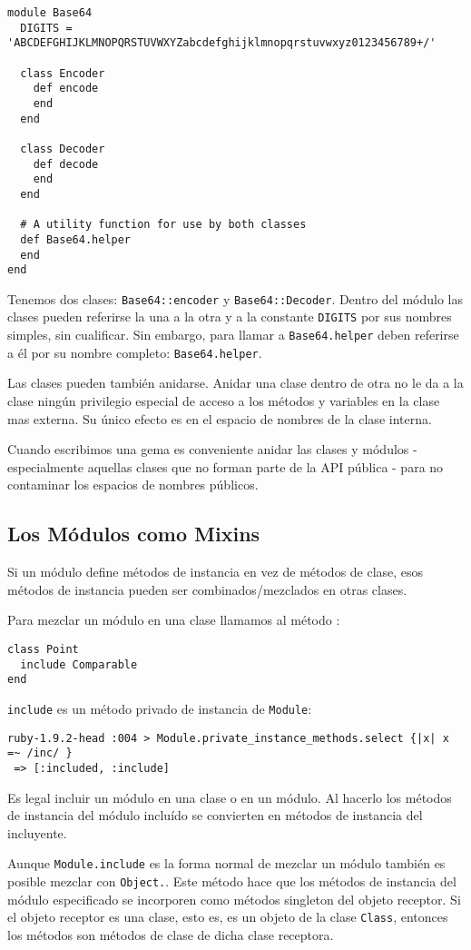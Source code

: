 \begin{verbatim}
module Base64
  DIGITS = 'ABCDEFGHIJKLMNOPQRSTUVWXYZabcdefghijklmnopqrstuvwxyz0123456789+/'

  class Encoder
    def encode
    end
  end

  class Decoder
    def decode
    end
  end

  # A utility function for use by both classes
  def Base64.helper
  end
end
\end{verbatim}
Tenemos dos clases: \verb|Base64::encoder| y \verb|Base64::Decoder|.
Dentro del módulo las clases pueden referirse la una a la otra y a la constante \verb|DIGITS| por
sus nombres simples, sin cualificar.
Sin embargo, para llamar a \verb|Base64.helper| deben referirse a él por
su nombre completo: \verb|Base64.helper|.

Las clases pueden también anidarse.
Anidar una clase dentro de otra no le da a la clase ningún privilegio especial de acceso a los 
métodos y variables en la clase mas externa.
Su único efecto es en el espacio de nombres de la clase interna.


Cuando escribimos una gema es conveniente anidar las clases y módulos - especialmente aquellas clases
que no forman parte de la API pública -
para no contaminar los espacios de nombres públicos.


\subsection{Los Módulos como Mixins}

Si un módulo define métodos de instancia en vez de métodos de clase,
esos métodos de instancia pueden ser combinados/mezclados en otras clases.

Para mezclar un módulo en una clase llamamos al método :
\begin{verbatim}
class Point
  include Comparable
end
\end{verbatim}
\verb|include| es un método privado de instancia de \verb|Module|:

\begin{verbatim}
ruby-1.9.2-head :004 > Module.private_instance_methods.select {|x| x =~ /inc/ }
 => [:included, :include] 
\end{verbatim}
Es legal incluir un módulo en una clase o en un  módulo.
Al hacerlo los métodos de instancia del módulo incluído
se convierten en métodos de instancia del incluyente.


Aunque \verb|Module.include| es la forma normal de mezclar un módulo también es posible
mezclar con \verb|Object.|.
Este método hace que los métodos de instancia del módulo especificado se 
incorporen como métodos singleton del objeto receptor.
Si el objeto receptor es una clase, esto es, es un objeto de la clase \verb|Class|,
entonces los métodos son métodos de clase de dicha clase receptora.

